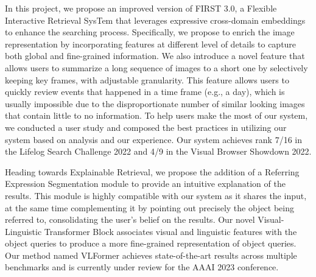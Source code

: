 \begin{EnAbstract}
\begin{spacing}{1.4}
In this project, we propose an improved version of FIRST 3.0, a Flexible Interactive Retrieval SysTem that leverages expressive cross-domain embeddings to enhance the searching process.
Specifically, we propose to enrich the image representation by incorporating features at different level of details to capture both global and fine-grained information.
We also introduce a novel feature that allows users to summarize a long sequence of images to a short one by selectively keeping key frames, with adjustable granularity.
This feature allows users to quickly review events that happened in a time frame (e.g., a day), which is usually impossible due to the disproportionate number of similar looking images that contain little to no information.
To help users make the most of our system, we conducted a user study and composed the best practices in utilizing our system based on analysis and our experience. 
Our system achieves rank 7/16 in the Lifelog Search Challenge 2022 and 4/9 in the Visual Browser Showdown 2022.

Heading towards Explainable Retrieval, we propose the addition of a Referring Expression Segmentation module to provide an intuitive explanation of the results.
This module is highly compatible with our system as it shares the input, at the same time complementing it by pointing out precisely the object being referred to, consolidating the user's belief on the results.
Our novel Visual-Linguistic Transformer Block associates visual and linguistic features with the object queries to produce a more fine-grained representation of object queries.
Our method named VLFormer achieves state-of-the-art results across multiple benchmarks and is currently under review for the AAAI 2023 conference.
\end{spacing}

\end{EnAbstract}